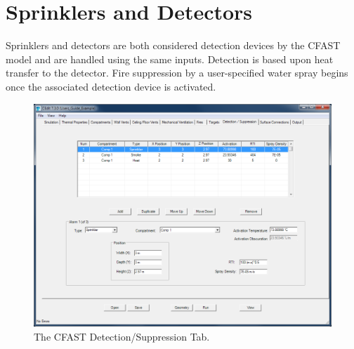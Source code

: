 \section{Sprinklers and Detectors}
\label{info:DEVC2}
Sprinklers and detectors are both considered detection devices by the CFAST model and are handled using the same inputs.  Detection is based upon heat transfer to the detector. Fire suppression by a user-specified water spray begins once the associated detection device is activated.


\begin{figure}[h!]
\begin{center}
\includegraphics[width=6.5in]{FIGURES/Detector_Tab}
\caption[The CFAST Detection/Suppression Tab]{The CFAST Detection/Suppression Tab.}
\end{center}
\end{figure}

